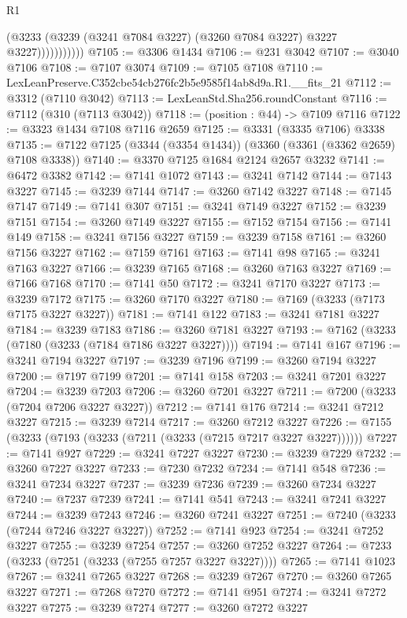 \begin{lexlean}{R1}
\begin{coremodule}
                      (@3233 (@3239 (@3241 @7084 @3227) (@3260 @7084 @3227) @3227 @3227)))))))))))
@7105 := @3306 @1434
@7106 := @231 @3042
@7107 := @3040 @7106
@7108 := @7107 @3074
@7109 := @7105 @7108
@7110 := LexLeanPreserve.C352cbe54cb276fc2b5e9585f14ab8d9a.R1.__fits_21
@7112 := @3312 (@7110 @3042)
@7113 := LexLeanStd.Sha256.roundConstant
@7116 := @7112 (@310 (@7113 @3042))
@7118 := (position : @44) -> @7109 @7116
@7122 := @3323 @1434 @7108 @7116 @2659
@7125 := @3331 (@3335 @7106) @3338
@7135 := @7122 @7125 (@3344 (@3354 @1434)) (@3360 (@3361 (@3362 @2659) @7108 @3338))
@7140 := @3370 @7125 @1684 @2124 @2657 @3232
@7141 := @6472 @3382
@7142 := @7141 @1072
@7143 := @3241 @7142
@7144 := @7143 @3227
@7145 := @3239 @7144
@7147 := @3260 @7142 @3227
@7148 := @7145 @7147
@7149 := @7141 @307
@7151 := @3241 @7149 @3227
@7152 := @3239 @7151
@7154 := @3260 @7149 @3227
@7155 := @7152 @7154
@7156 := @7141 @149
@7158 := @3241 @7156 @3227
@7159 := @3239 @7158
@7161 := @3260 @7156 @3227
@7162 := @7159 @7161
@7163 := @7141 @98
@7165 := @3241 @7163 @3227
@7166 := @3239 @7165
@7168 := @3260 @7163 @3227
@7169 := @7166 @7168
@7170 := @7141 @50
@7172 := @3241 @7170 @3227
@7173 := @3239 @7172
@7175 := @3260 @7170 @3227
@7180 := @7169 (@3233 (@7173 @7175 @3227 @3227))
@7181 := @7141 @122
@7183 := @3241 @7181 @3227
@7184 := @3239 @7183
@7186 := @3260 @7181 @3227
@7193 := @7162 (@3233 (@7180 (@3233 (@7184 @7186 @3227 @3227))))
@7194 := @7141 @167
@7196 := @3241 @7194 @3227
@7197 := @3239 @7196
@7199 := @3260 @7194 @3227
@7200 := @7197 @7199
@7201 := @7141 @158
@7203 := @3241 @7201 @3227
@7204 := @3239 @7203
@7206 := @3260 @7201 @3227
@7211 := @7200 (@3233 (@7204 @7206 @3227 @3227))
@7212 := @7141 @176
@7214 := @3241 @7212 @3227
@7215 := @3239 @7214
@7217 := @3260 @7212 @3227
@7226 := @7155 (@3233 (@7193 (@3233 (@7211 (@3233 (@7215 @7217 @3227 @3227))))))
@7227 := @7141 @927
@7229 := @3241 @7227 @3227
@7230 := @3239 @7229
@7232 := @3260 @7227 @3227
@7233 := @7230 @7232
@7234 := @7141 @548
@7236 := @3241 @7234 @3227
@7237 := @3239 @7236
@7239 := @3260 @7234 @3227
@7240 := @7237 @7239
@7241 := @7141 @541
@7243 := @3241 @7241 @3227
@7244 := @3239 @7243
@7246 := @3260 @7241 @3227
@7251 := @7240 (@3233 (@7244 @7246 @3227 @3227))
@7252 := @7141 @923
@7254 := @3241 @7252 @3227
@7255 := @3239 @7254
@7257 := @3260 @7252 @3227
@7264 := @7233 (@3233 (@7251 (@3233 (@7255 @7257 @3227 @3227))))
@7265 := @7141 @1023
@7267 := @3241 @7265 @3227
@7268 := @3239 @7267
@7270 := @3260 @7265 @3227
@7271 := @7268 @7270
@7272 := @7141 @951
@7274 := @3241 @7272 @3227
@7275 := @3239 @7274
@7277 := @3260 @7272 @3227

\end{coremodule}
\end{lexlean}
